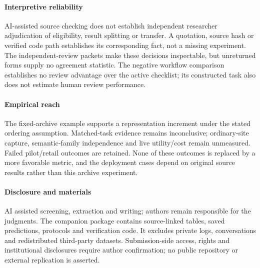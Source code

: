 \paragraph{Interpretive reliability}
AI-assisted source checking does not establish independent researcher adjudication of eligibility, result splitting or transfer. A quotation, source hash or verified code path establishes its corresponding fact, not a missing experiment. The independent-review packets make these decisions inspectable, but unreturned forms supply no agreement statistic. The negative workflow comparison establishes no review advantage over the active checklist; its constructed task also does not estimate human review performance.

\paragraph{Empirical reach}
The fixed-archive example supports a representation increment under the stated ordering assumption. Matched-task evidence remains inconclusive; ordinary-site capture, semantic-family independence and live utility/cost remain unmeasured. Failed pilot/retail outcomes are retained. None of these outcomes is replaced by a more favorable metric, and the deployment cases depend on original source results rather than this archive experiment.

\paragraph{Disclosure and materials}
AI assisted screening, extraction and writing; authors remain responsible for the judgments. The companion package contains source-linked tables, saved predictions, protocols and verification code. It excludes private logs, conversations and redistributed third-party datasets. Submission-side access, rights and institutional disclosures require author confirmation; no public repository or external replication is asserted.
